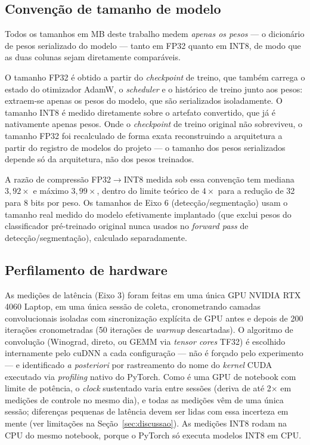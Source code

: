 \documentclass[conference]{IEEEtran}
\begin{document}
\subsection{Convenção de tamanho de modelo}
\label{sec:convencao_tamanho}
Todos os tamanhos em MB deste trabalho medem \emph{apenas os pesos} — o dicionário de pesos
serializado do modelo — tanto em FP32 quanto em INT8, de modo que as duas colunas sejam
diretamente comparáveis.

O tamanho FP32 é obtido a partir do \textit{checkpoint} de treino, que também carrega o estado do
otimizador AdamW, o \textit{scheduler} e o histórico de treino junto aos pesos: extraem-se apenas os
pesos do modelo, que são serializados isoladamente. O tamanho INT8 é medido diretamente sobre
o artefato convertido, que já é nativamente apenas pesos. Onde o \textit{checkpoint} de treino
original não sobreviveu, o tamanho FP32 foi recalculado de forma exata reconstruindo a arquitetura
a partir do registro de modelos do projeto — o tamanho dos pesos serializados depende só da
arquitetura, não dos pesos treinados.

A razão de compressão FP32$\to$INT8 medida sob essa convenção tem mediana $3{,}92\times$ e máximo
$3{,}99\times$, dentro do limite teórico de $4\times$ para a redução de 32 para 8 bits por peso. Os
tamanhos de Eixo 6 (detecção/segmentação) usam o tamanho real medido do modelo efetivamente
implantado (que exclui pesos do classificador pré-treinado original nunca usados no
\textit{forward pass} de detecção/segmentação), calculado separadamente.

\subsection{Perfilamento de hardware}
\label{sec:profiling}
As medições de latência (Eixo 3) foram feitas em uma única GPU NVIDIA RTX 4060 Laptop, em
uma única sessão de coleta, cronometrando camadas convolucionais isoladas com sincronização
explícita de GPU antes e depois de 200 iterações cronometradas (50 iterações de \textit{warmup}
descartadas). O algoritmo de convolução (Winograd, direto, ou GEMM via \textit{tensor cores}
TF32) é escolhido internamente pelo cuDNN a cada configuração — não é forçado pelo experimento —
e identificado \textit{a posteriori} por rastreamento do nome do \textit{kernel} CUDA executado via
\textit{profiling} nativo do PyTorch. Como é uma GPU de notebook com limite de potência, o
\textit{clock} sustentado varia entre sessões (deriva de até 2$\times$ em medições de controle no
mesmo dia), e todas as medições vêm de uma única sessão; diferenças pequenas de latência devem ser
lidas com essa incerteza em mente (ver limitações na Seção~\ref{sec:discussao}). As medições INT8
rodam na CPU do mesmo notebook, porque o PyTorch só executa modelos INT8 em CPU.
\end{document}
